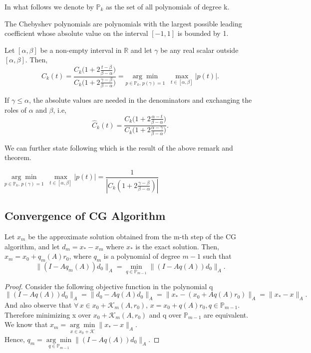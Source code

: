 \documentclass[10pt,a4paper]{article}
\begin{document}
In what follows  we denote by $\mathbb{P}_k$ as the set of all polynomials of degree k.

\begin{remark}
The Chebyshev polynomials are polynomials with the largest possible leading coefficient whose absolute value on the interval $[-1,1]$ is bounded by 1.
\end{remark}

\begin{theorem}
Let $[\alpha,\beta]$ be a non-empty interval in $\mathbb{R}$ and let $\gamma$ be any real scalar outside $[\alpha,\beta].$ Then,
$$\hat{C}_k(t)=\frac{C_k\Big(1+2\frac{t-\beta}{\beta-\alpha}\Big)}{C_k\Big(1+2\frac{\gamma-\beta}{\beta-\alpha}\Big)}=\underset{p\in\mathbb{P}_k,\,p(\gamma)=1}{\arg\min}\;\;\underset{t\in[\alpha,\beta]}{\max}|p(t)|.$$
\end{theorem}

\begin{remark}
If $\gamma\le\alpha$, the absolute values are needed in the denominators and exchanging the roles of $\alpha$ and $\beta$, i.e,
$$\hat{C}_k(t)=\frac{C_k\Big(1+2\frac{\alpha-t}{\beta-\alpha}\Big)}{C_k\Big(1+2\frac{\alpha-\gamma}{\beta-\alpha}\Big)}.$$
\end{remark}

We can further state following which is the result of the above remark and theorem.

\begin{corollary}
$\underset{p\in\mathbb{P}_k,\,p(\gamma)=1}{\arg\min}\;\;\underset{t\in[\alpha,\beta]}{\max}|p(t)| = \dfrac{1}{|C_k(1+2\frac{\gamma-\beta}{\beta-\alpha})|}$
\end{corollary}

\subsection{Convergence of CG Algorithm}

\begin{lemma}
Let $x_m$ be the approximate solution obtained from the m-th step of the CG algorithm, and let $d_m=x_*-x_m$ where $x_*$ is the exact solution. Then, $x_m=x_0+q_m(A)r_0$, where $q_m$ is a polynomial of degree $m-1$ such that
$$\|(I-Aq_m(A))d_0\|_A = \underset{q\in \mathbb{P}_{m-1}}{\min}\|(I-Aq(A))d_0\|_A.$$
\end{lemma}

\begin{proof}
Consider the following objective function in the polynomial q
$$\|(I-Aq(A))d_0\|_A = \|d_0-Aq(A)d_0\|_A = \|x_*-(x_0+Aq(A)r_0)\|_A = \|x_*-x\|_A.$$
And also observe that $\forall\,x\in x_0+\mathcal{K}_m(A,r_0),\,x=x_0+q(A)r_0,q\in\mathbb{P}_{m-1}$. Therefore minimizing x over $x_0+\mathcal{K}_m(A,r_0)$ and q over $\mathbb{P}_{m-1}$ are equivalent. We know that $x_m = \underset{x\in x_0+\mathcal{K}}{\arg\min}\|x_*-x\|_A$. $\text{Hence, }q_m=\underset{q\in \mathbb{P}_{m-1}}{\arg\min}\|(I-Aq(A))d_0\|_A.$
\end{proof}
\end{document}
